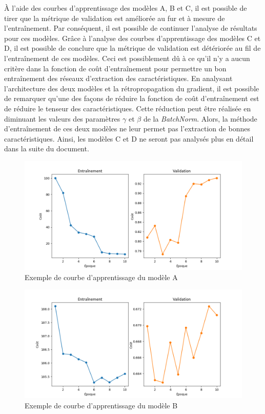     À l'aide des courbes d'apprentissage des modèles A, B et C, il est possible de tirer que la métrique de validation est améliorée au fur et à mesure de l'entraînement. Par conséquent, il est possible de continuer l'analyse de résultats pour ces modèles. Grâce à l'analyse des courbes d'apprentissage des modèles C et D, il est possible de conclure que la métrique de validation est détériorée au fil de l'entraînement de ces modèles. Ceci est possiblement dû à ce qu'il n'y a aucun critère dans la fonction de coût d'entraînement pour permettre un bon entraînement des réseaux d'extraction des caractéristiques. En analysant l'architecture des deux modèles et la rétropropagation du gradient, il est possible de remarquer qu'une des façons de réduire la fonction de coût d'entraînement est de réduire le tenseur des caractéristiques. Cette réduction peut être réalisée en diminuant les valeurs des paramètres \(\gamma\) et \(\beta\) de la \textit{BatchNorm}. Alors, la méthode d'entraînement de ces deux modèles ne leur permet pas l'extraction de bonnes caractéristiques. Ainsi, les modèles C et D ne seront pas analysés plus en détail dans la suite du document.

    \begin{figure}
        \centering
        \includegraphics[width=16cm]{images/learning_curves_a.png}
        \caption{Exemple de courbe d'apprentissage du modèle A}
        \label{fig:learning_curves_a}
    \end{figure}

    \begin{figure}
        \centering
        \includegraphics[width=16cm]{images/learning_curves_b.png}
        \caption{Exemple de courbe d'apprentissage du modèle B}
        \label{fig:learning_curves_b}
    \end{figure}

